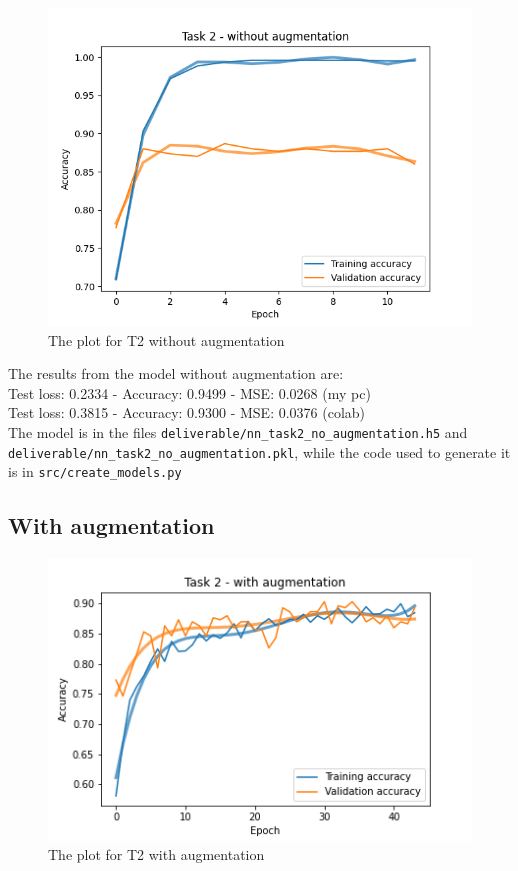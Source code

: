\documentclass[11pt]{scrartcl}
\begin{document}
		\begin{figure}[H]
			\centering
			\includegraphics[width=\textwidth]{src/plot_task2_no_augmentation.png}
			\caption{The plot for T2 without augmentation}
			\label{fig:plot_T2_1}
		\end{figure}

		The results from the model without augmentation are:\\
		
		Test loss: 0.2334 - Accuracy: 0.9499 - MSE: 0.0268 (my pc)\\
		Test loss: 0.3815 - Accuracy: 0.9300 - MSE: 0.0376 (colab)\\

		The model is in the files \texttt{deliverable/nn\_task2\_no\_augmentation.h5} and\\ 
		\texttt{deliverable/nn\_task2\_no\_augmentation.pkl}, while the code used to generate 
		it is in \texttt{src/create\_models.py}


	\subsection*{With augmentation}

		\begin{figure}[H]
			\centering
			\includegraphics[width=\textwidth]{src/plot_task2_augmentation.png}
			\caption{The plot for T2 with augmentation}
			\label{fig:plot_T2_2}
		\end{figure}
\end{document}
